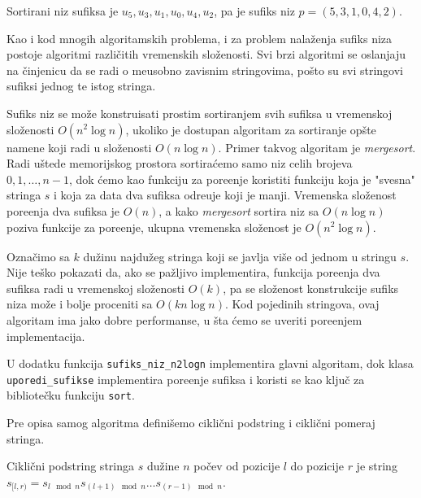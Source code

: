 Sortirani niz sufiksa je $u_5, u_3, u_1, u_0, u_4, u_2$, pa je sufiks niz $p = (5,3,1,0,4,2)$.


Kao i kod mnogih algoritamskih problema, i za problem nala\v zenja sufiks niza postoje algoritmi razli\v citih vremenskih slo\v zenosti. Svi brzi algoritmi se oslanjaju na \v cinjenicu da se radi o me\dj usobno zavisnim stringovima, po\v sto su svi stringovi sufiksi jednog te istog stringa.


Sufiks niz se mo\v ze konstruisati prostim sortiranjem svih sufiksa u vremenskoj slo\v zenosti $O(n^2 \log n)$, ukoliko je dostupan algoritam za sortiranje op\v ste namene koji radi u slo\v zenosti $O(n \log n)$. Primer takvog algoritam je \textit{mergesort}. Radi u\v stede memorijskog prostora sortira\' cemo samo niz celih brojeva $0,1,\ldots,n-1$, dok \' cemo kao funkciju za pore\dj enje koristiti funkciju koja je "svesna" stringa $s$ i koja za data dva sufiksa odre\dj uje koji je manji. Vremenska slo\v zenost pore\dj enja dva sufiksa je $O(n)$, a kako \textit{mergesort} sortira niz sa $O(n \log n)$ poziva funkcije za pore\dj enje, ukupna vremenska slo\v zenost je $O(n^2 \log n)$.

Ozna\v cimo sa $k$ du\v zinu najdu\v zeg stringa koji se javlja vi\v se od jednom u stringu $s$. Nije te\v sko pokazati da, ako se pa\v zljivo implementira, funkcija pore\dj enja dva sufiksa radi u vremenskoj slo\v zenosti $O(k)$, pa se slo\v zenost konstrukcije sufiks niza mo\v ze i bolje proceniti sa $O(kn \log n)$. Kod pojedinih stringova, ovaj algoritam ima jako dobre performanse, u \v sta \' cemo se uveriti pore\dj enjem implementacija.

U dodatku \sirdodatak funkcija \texttt{sufiks\_niz\_n2logn} implementira glavni algoritam, dok klasa \texttt{uporedi\_sufikse} implementira pore\dj enje sufiksa i koristi se kao klju\v c za bibliote\v cku funkciju \texttt{sort}.


Pre opisa samog algoritma defini\v semo cikli\v cni podstring i cikli\v cni pomeraj stringa.

\begin{dfn}
Cikli\v cni podstring stringa $s$ du\v zine $n$ po\v cev od pozicije $l$ do pozicije $r$ je string $s_{[l, r)} = s_{l \mod n}s_{(l+1)\mod n}\ldots s_{(r-1)\mod n}$.
\end{dfn}

